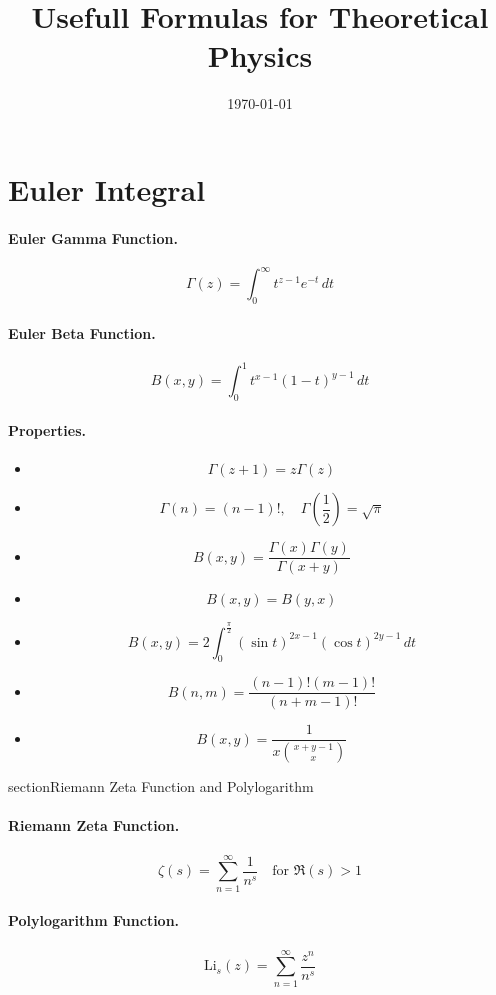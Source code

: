 \documentclass{article}
\begin{document}
\title{Usefull Formulas for Theoretical Physics}
\date{\today}
\maketitle


\section{Euler Integral}
\paragraph{Euler Gamma Function.}
\[
\Gamma(z) = \int_{0}^{\infty} t^{z-1} e^{-t} \, dt
\]
\paragraph{Euler Beta Function.}
\[
B(x, y) = \int_{0}^{1} t^{x-1} (1-t)^{y-1} \, dt
\]
\paragraph{Properties.}
\begin{itemize}
    \item 
    \[
    \Gamma(z+1) = z \Gamma(z)
    \]
    \item 
    \[
    \Gamma(n) = (n-1)!, \quad \Gamma\left(\frac{1}{2}\right) = \sqrt{\pi}
    \]
    \item 
    \[
    B(x, y) = \frac{\Gamma(x)\Gamma(y)}{\Gamma(x+y)}
    \]
    \item 
    \[
    B(x, y) = B(y, x)
    \]
    \item
    \[
    B(x, y) = 2 \int_{0}^{\frac{\pi}{2}} (\sin t)^{2x-1} (\cos t)^{2y-1} \, dt
    \]
    \item
    \[
    B(n, m) = \frac{(n-1)!(m-1)!}{(n+m-1)!}
    \]
    \item 
    \[
    B(x, y) = \frac{1}{x \binom{x+y-1}{x}}
    \]
\end{itemize}

section{Riemann Zeta Function and Polylogarithm}
\paragraph{Riemann Zeta Function.}
\[
\zeta(s) = \sum_{n=1}^{\infty} \frac{1}{n^s} \quad \text{for } \Re(s) > 1
\]
\paragraph{Polylogarithm Function.}
\[
\text{Li}_s(z) = \sum_{n=1}^{\infty} \frac{z^n}{n^s}
\]
\end{document}
